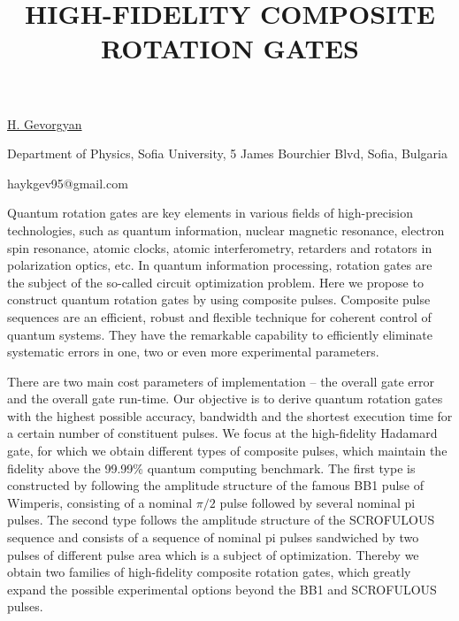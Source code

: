 \title{HIGH-FIDELITY COMPOSITE ROTATION GATES}

\underline{H. Gevorgyan}  

{\normalsize{\vspace{-4mm}
Department of Physics, Sofia University, 5 James Bourchier Blvd, Sofia, Bulgaria



\email haykgev95@gmail.com}}

Quantum rotation gates are key elements in various fields of 
high-precision technologies, such as quantum information, nuclear 
magnetic resonance, electron spin resonance, atomic clocks, atomic 
interferometry, retarders and rotators in polarization optics, etc. In 
quantum information processing, rotation gates are the subject of the 
so-called circuit optimization problem. Here we propose to construct 
quantum rotation gates by using composite pulses. Composite pulse 
sequences are an efficient, robust and flexible technique for coherent 
control of quantum systems. They have the remarkable capability to 
efficiently eliminate systematic errors in one, two or even more 
experimental parameters.

There are two main cost parameters of implementation – the overall gate 
error and the overall gate run-time. Our objective is to derive quantum 
rotation gates with the highest possible accuracy, bandwidth and the 
shortest execution time for a certain number of constituent pulses. We 
focus at the high-fidelity Hadamard gate, for which we obtain different 
types of composite pulses, which maintain the fidelity above the 99.99\% quantum computing benchmark. The first type is constructed by following 
the amplitude structure of the famous BB1 pulse of Wimperis, consisting 
of a nominal $\pi/2$ pulse followed by several nominal pi pulses. The 
second type follows the amplitude structure of the SCROFULOUS sequence 
and consists of a sequence of nominal pi pulses sandwiched by two pulses 
of different pulse area which is a subject of optimization. Thereby we 
obtain two families of high-fidelity composite rotation gates, which 
greatly expand the possible experimental options beyond the BB1 and 
SCROFULOUS pulses.


\vspace{\baselineskip}

